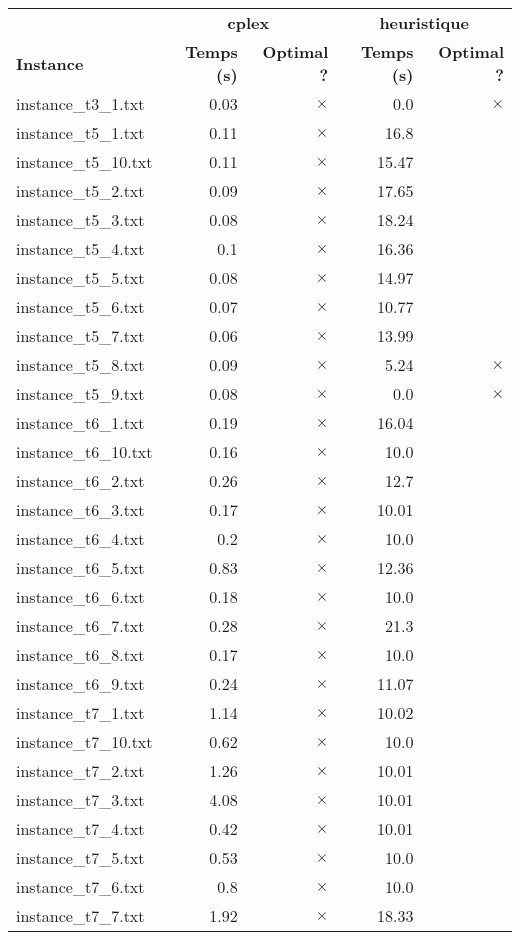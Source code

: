 \documentclass{article}
\begin{document}
\begin{center}
\renewcommand{\arraystretch}{1.4} 
 \begin{tabular}{lrrrr}
	\hline
 & \multicolumn{2}{c}{\textbf{cplex}} & \multicolumn{2}{c}{\textbf{heuristique}}\\
\textbf{Instance}  & \textbf{Temps (s)} & \textbf{Optimal ?}  & \textbf{Temps (s)} & \textbf{Optimal ?} \\\hline

instance\_t3\_1.txt & 0.03 & 
$\times$
 & 0.0 & 
$\times$
\\
instance\_t5\_1.txt & 0.11 & 
$\times$
 & 16.8 & 
\\
instance\_t5\_10.txt & 0.11 & 
$\times$
 & 15.47 & 
\\
instance\_t5\_2.txt & 0.09 & 
$\times$
 & 17.65 & 
\\
instance\_t5\_3.txt & 0.08 & 
$\times$
 & 18.24 & 
\\
instance\_t5\_4.txt & 0.1 & 
$\times$
 & 16.36 & 
\\
instance\_t5\_5.txt & 0.08 & 
$\times$
 & 14.97 & 
\\
instance\_t5\_6.txt & 0.07 & 
$\times$
 & 10.77 & 
\\
instance\_t5\_7.txt & 0.06 & 
$\times$
 & 13.99 & 
\\
instance\_t5\_8.txt & 0.09 & 
$\times$
 & 5.24 & 
$\times$
\\
instance\_t5\_9.txt & 0.08 & 
$\times$
 & 0.0 & 
$\times$
\\
instance\_t6\_1.txt & 0.19 & 
$\times$
 & 16.04 & 
\\
instance\_t6\_10.txt & 0.16 & 
$\times$
 & 10.0 & 
\\
instance\_t6\_2.txt & 0.26 & 
$\times$
 & 12.7 & 
\\
instance\_t6\_3.txt & 0.17 & 
$\times$
 & 10.01 & 
\\
instance\_t6\_4.txt & 0.2 & 
$\times$
 & 10.0 & 
\\
instance\_t6\_5.txt & 0.83 & 
$\times$
 & 12.36 & 
\\
instance\_t6\_6.txt & 0.18 & 
$\times$
 & 10.0 & 
\\
instance\_t6\_7.txt & 0.28 & 
$\times$
 & 21.3 & 
\\
instance\_t6\_8.txt & 0.17 & 
$\times$
 & 10.0 & 
\\
instance\_t6\_9.txt & 0.24 & 
$\times$
 & 11.07 & 
\\
instance\_t7\_1.txt & 1.14 & 
$\times$
 & 10.02 & 
\\
instance\_t7\_10.txt & 0.62 & 
$\times$
 & 10.0 & 
\\
instance\_t7\_2.txt & 1.26 & 
$\times$
 & 10.01 & 
\\
instance\_t7\_3.txt & 4.08 & 
$\times$
 & 10.01 & 
\\
instance\_t7\_4.txt & 0.42 & 
$\times$
 & 10.01 & 
\\
instance\_t7\_5.txt & 0.53 & 
$\times$
 & 10.0 & 
\\
instance\_t7\_6.txt & 0.8 & 
$\times$
 & 10.0 & 
\\
instance\_t7\_7.txt & 1.92 & 
$\times$
 & 18.33 & 
\\
\hline\end{tabular}
\end{center}
\end{document}
